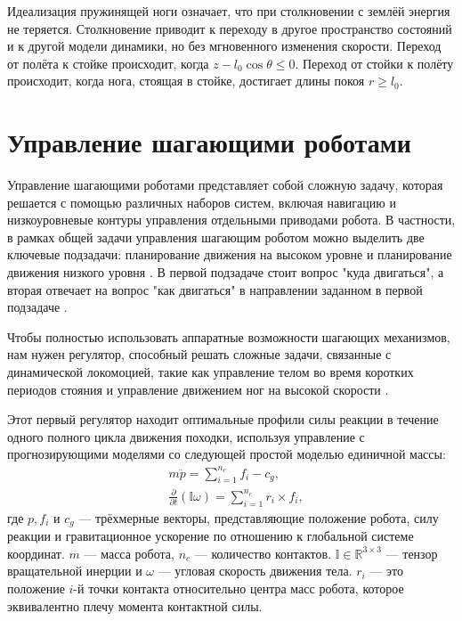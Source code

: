 Идеализация пружинящей ноги означает, что при столкновении с землёй энергия не теряется. Столкновение приводит к переходу в другое пространство состояний и к другой модели динамики, но без мгновенного изменения скорости. Переход от полёта к стойке происходит, когда $z -
l_0\cos\theta \le 0.$  Переход от стойки к полёту происходит, когда нога, стоящая в стойке, достигает длины покоя $r \ge l_0$.

\section{Управление шагающими роботами}\label{sec:ch2/sect6}

Управление шагающими роботами представляет собой сложную задачу, которая решается с помощью различных наборов систем, включая навигацию и низкоуровневые контуры управления отдельными приводами робота. В частности, в рамках общей задачи управления шагающим роботом можно выделить две ключевые подзадачи: планирование движения на высоком уровне и планирование движения низкого уровня \cite{WalkingRobots}. В первой подзадаче стоит вопрос "куда двигаться", а вторая отвечает на вопрос "как двигаться"  в направлении заданном в первой подзадаче \cite{bib1}.

Чтобы полностью использовать аппаратные возможности шагающих механизмов, нам нужен регулятор, способный решать сложные задачи, связанные с динамической локомоцией, такие как управление телом во время коротких периодов стояния и управление движением ног на высокой скорости \cite{KIM2019}.

Этот первый регулятор находит оптимальные профили силы реакции в течение одного полного цикла движения походки, используя управление с прогнозирующими моделями со следующей простой моделью единичной массы:
\begin{align}
	& m \ddot{p} = \sum_{i=1}^{n_c}f_i-c_g,\\
	& \frac{\partial}{\partial t}(\mathbb{I} \omega) = \sum_{i=1}^{n_c} r_i \times f_i,
\end{align}
где $p, f_i$ и $c_g$ --- трёхмерные векторы, представляющие положение робота, силу реакции и гравитационное ускорение по отношению к глобальной системе координат. $m$ --- масса робота, $n_c$ --- количество контактов. $\mathbb{I} \in \mathbb{R}^{3\times 3}$ --- тензор вращательной инерции и $\omega$ --- угловая скорость движения тела. $r_i$ --- это положение $i$-й точки контакта относительно центра масс робота, которое эквивалентно плечу момента контактной силы.

